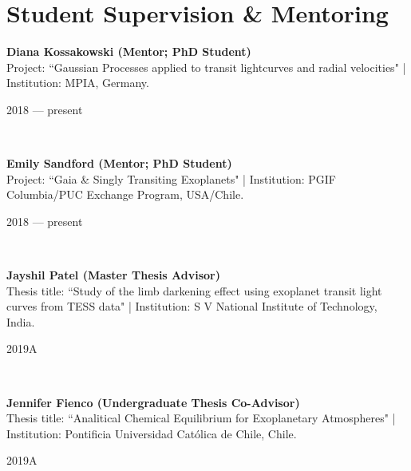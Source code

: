 \documentclass[12pt, a4paper]{article} %
\begin{document}
\section*{Student Supervision \& Mentoring}
\begin{minipage}[t]{0.7\textwidth}
\begin{flushleft}%
  \setlength{\leftskip}{0.2cm}%
\textbf{Diana Kossakowski (Mentor; PhD Student)}\\
Project: ``Gaussian Processes applied to transit lightcurves and radial velocities" | Institution: MPIA, Germany.
\end{flushleft}
\end{minipage}
\begin{minipage}[t]{0.3\textwidth}
\hfill 2018 --- present
\end{minipage}\\

\begin{minipage}[t]{0.7\textwidth}
\begin{flushleft}%
  \setlength{\leftskip}{0.2cm}%
\textbf{Emily Sandford (Mentor; PhD Student)}\\
Project: ``Gaia \& Singly Transiting Exoplanets" | Institution: PGIF Columbia/PUC Exchange Program, USA/Chile.
\end{flushleft}
\end{minipage}
\begin{minipage}[t]{0.3\textwidth}
\hfill 2018 --- present
\end{minipage}\\

\begin{minipage}[t]{0.7\textwidth}
\begin{flushleft}%
  \setlength{\leftskip}{0.2cm}%
\textbf{Jayshil Patel (Master Thesis Advisor)}\\
Thesis title: ``Study of the limb darkening effect using exoplanet transit light curves from TESS data" | Institution: S V National Institute of Technology, India.
\end{flushleft}
\end{minipage}
\begin{minipage}[t]{0.3\textwidth}
\hfill 2019A
\end{minipage}\\

\begin{minipage}[t]{0.7\textwidth}
\begin{flushleft}%
  \setlength{\leftskip}{0.2cm}%
\textbf{Jennifer Fienco (Undergraduate Thesis Co-Advisor)}\\
Thesis title: ``Analitical Chemical Equilibrium for Exoplanetary Atmospheres" | Institution: Pontificia Universidad Cat\'olica de Chile, Chile.
\end{flushleft}
\end{minipage}
\begin{minipage}[t]{0.3\textwidth}
\hfill 2019A
\end{minipage}\\
\end{document}
